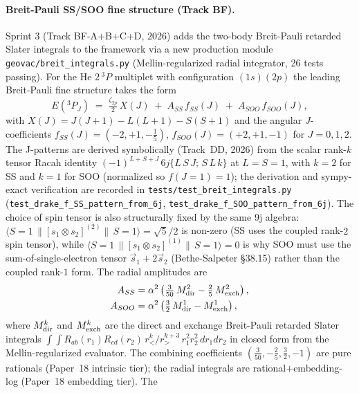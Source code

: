 \documentclass[aps,pra,twocolumn,superscriptaddress,longbibliography]{revtex4-2}
\begin{document}
\paragraph{Breit-Pauli SS/SOO fine structure (Track BF).}
Sprint 3 (Track BF-A+B+C+D, 2026) adds the two-body Breit-Pauli
retarded Slater integrals to the framework via a new production
module \texttt{geovac/breit\_integrals.py} (Mellin-regularized
radial integrator, 26 tests passing).  For the He $2\,^3\!P$
multiplet with configuration $(1s)(2p)$ the leading Breit-Pauli
fine structure takes the form
\begin{equation}\label{eq:breit_pauli_3P}
  E(^3P_J) \;=\; \tfrac{\zeta_{2p}}{2}\,X(J) \;+\; A_{SS}\,f_{SS}(J) \;+\; A_{SOO}\,f_{SOO}(J),
\end{equation}
with $X(J) = J(J+1) - L(L+1) - S(S+1)$ and the angular
$J$-coefficients
$f_{SS}(J) = (-2, +1, -\tfrac{1}{5})$, $f_{SOO}(J) = (+2, +1, -1)$
for $J = 0, 1, 2$.  The J-patterns are derived symbolically
(Track~DD, 2026) from the scalar rank-$k$ tensor Racah identity
$(-1)^{L+S+J}\,6j\{L\,S\,J;\,S\,L\,k\}$ at $L = S = 1$, with
$k = 2$ for SS and $k = 1$ for SOO (normalized so $f(J=1) = 1$);
the derivation and sympy-exact verification are recorded in
\texttt{tests/test\_breit\_integrals.py}
(\texttt{test\_drake\_f\_SS\_pattern\_from\_6j},
\texttt{test\_drake\_f\_SOO\_pattern\_from\_6j}).  The choice of
spin tensor is also structurally fixed by the same 9j algebra:
$\langle S{=}1\,\|[s_1\!\otimes\!s_2]^{(2)}\|\,S{=}1\rangle = \sqrt{5}/2$
is non-zero (SS uses the coupled rank-$2$ spin tensor), while
$\langle S{=}1\,\|[s_1\!\otimes\!s_2]^{(1)}\|\,S{=}1\rangle = 0$
is why SOO must use the sum-of-single-electron tensor
$\vec s_1 + 2\vec s_2$ (Bethe-Salpeter \S38.15) rather than the
coupled rank-$1$ form.  The radial amplitudes are
\begin{align}\label{eq:drake_amplitudes}
  A_{SS}  &= \alpha^2 \left( \tfrac{3}{50}\, M^2_{\rm dir} - \tfrac{2}{5}\, M^2_{\rm exch} \right), \\
  A_{SOO} &= \alpha^2 \left( \tfrac{3}{2}\, M^1_{\rm dir} - M^1_{\rm exch} \right),\nonumber
\end{align}
where $M^k_{\rm dir}$ and $M^k_{\rm exch}$ are the direct and
exchange Breit-Pauli retarded Slater integrals
$\int\!\!\int R_{ab}(r_1) R_{cd}(r_2)\, r_<^k/r_>^{k+3}\, r_1^2 r_2^2\, dr_1 dr_2$
in closed form from the Mellin-regularized evaluator.  The
combining coefficients $(\tfrac{3}{50}, -\tfrac{2}{5}, \tfrac{3}{2}, -1)$
are pure rationals (Paper~18 intrinsic tier); the radial integrals
are rational$+$embedding-log (Paper~18 embedding tier).  The
\end{document}
